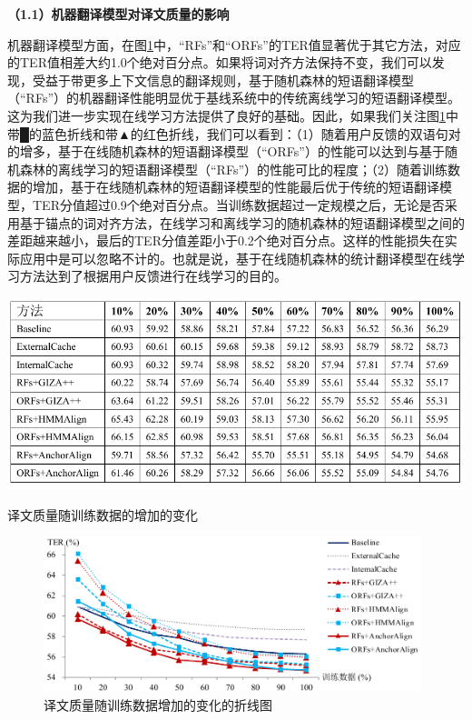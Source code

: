 \textbf{（1.1）机器翻译模型对译文质量的影响}

机器翻译模型方面，在图\ref{Figure_quality_trainning_percent}中，“RFs”和“ORFs”的TER值显著优于其它方法，对应的TER值相差大约1.0个绝对百分点。如果将词对齐方法保持不变，我们可以发现，受益于带更多上下文信息的翻译规则，基于随机森林的短语翻译模型（“RFs”）的机器翻译性能明显优于基线系统中的传统离线学习的短语翻译模型。这为我们进一步实现在线学习方法提供了良好的基础。因此，如果我们关注图\ref{Figure_quality_trainning_percent}中带█的蓝色折线和带▲的红色折线，我们可以看到：（1）随着用户反馈的双语句对的增多，基于在线随机森林的短语翻译模型（“ORFs”）的性能可以达到与基于随机森林的离线学习的短语翻译模型（“RFs”）的性能可比的程度；（2）随着训练数据的增加，基于在线随机森林的短语翻译模型的性能最后优于传统的短语翻译模型，TER分值超过0.9个绝对百分点。当训练数据超过一定规模之后，无论是否采用基于锚点的词对齐方法，在线学习和离线学习的随机森林的短语翻译模型之间的差距越来越小，最后的TER分值差距小于0.2个绝对百分点。这样的性能损失在实际应用中是可以忽略不计的。也就是说，基于在线随机森林的统计翻译模型在线学习方法达到了根据用户反馈进行在线学习的目的。

\begin{table}[!bt]
	\centering
	\includegraphics[width=\textwidth]{Figure/Table_5_1.pdf}
	\caption{译文质量随训练数据的增加的变化}
	\label{Table_quality_trainning_percent}
\end{table}

\begin{figure}[!bt]
	\centering
	\includegraphics[width=0.98\textwidth]{Figure/Figure_5_6.pdf}
	\caption{译文质量随训练数据增加的变化的折线图}
	\label{Figure_quality_trainning_percent}
\end{figure}

